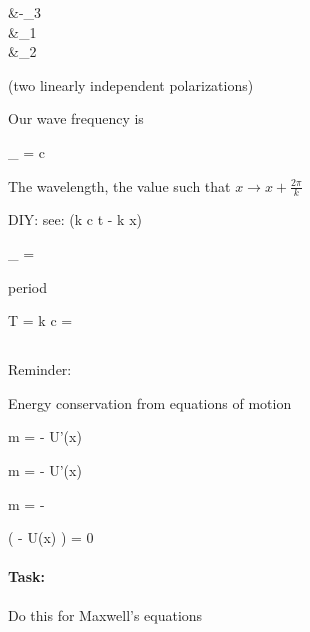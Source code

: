 \BB &\parallel -\Be_3 \\
\BE &\parallel \Be_1 \\
\Bk &\parallel \Be_2

(two linearly independent polarizations)

Our wave frequency is

\omega_{\Bk} = c \Abs{\Bk}

The wavelength, the value such that $x \rightarrow x + \frac{2 \pi}{k}$

DIY: see:
\sin(k c t - k x)

\lambda_{\Bk} = 

period

T = \frac{ 2 \pi} {k c} =  


\subsection{}

Reminder:

Energy conservation from equations of motion

m  = - U'(x)

m   = -  U'(x)

m  = - 

\ddt{} \left(  - U(x) \right) = 0

\paragraph{Task:} Do this for Maxwell's equations

\EndArticle
